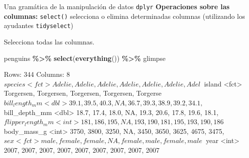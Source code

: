 \documentclass[
  ignorenonframetext,
  aspectratio=169]{beamer}
\newenvironment{Shaded}{\begin{snugshade}}{\end{snugshade}}
\newcommand{\FunctionTok}[1]{\textcolor[rgb]{0.13,0.29,0.53}{\textbf{#1}}}
\newcommand{\NormalTok}[1]{#1}
\newcommand{\SpecialCharTok}[1]{\textcolor[rgb]{0.81,0.36,0.00}{\textbf{#1}}}
\let\oldverbatim\verbatim
\let\endoldverbatim\endverbatim
\renewenvironment{verbatim}{\tiny\oldverbatim}{\endoldverbatim}
\begin{document}

\begin{frame}[fragile]{Una gramática de la manipulación de datos
\texttt{dplyr}}
\label{una-gramuxe1tica-de-la-manipulaciuxf3n-de-datos-dplyr-8}
\textbf{Operaciones sobre las columnas:} \texttt{select()} selecciona o
elimina determinadas columnas (utilizando los ayudantes
\texttt{tidyselect})

Selecciona todas las columnas.

\begin{Shaded}
\begin{Highlighting}[]
\NormalTok{penguins }\SpecialCharTok{\%\textgreater{}\%} 
  \FunctionTok{select}\NormalTok{(}\FunctionTok{everything}\NormalTok{()) }\SpecialCharTok{\%\textgreater{}\%} 
\NormalTok{  glimpse}
\end{Highlighting}
\end{Shaded}

\begin{verbatim}
Rows: 344
Columns: 8
$ species           <fct> Adelie, Adelie, Adelie, Adelie, Adelie, Adelie, Adel~
$ island            <fct> Torgersen, Torgersen, Torgersen, Torgersen, Torgerse~
$ bill_length_mm    <dbl> 39.1, 39.5, 40.3, NA, 36.7, 39.3, 38.9, 39.2, 34.1, ~
$ bill_depth_mm     <dbl> 18.7, 17.4, 18.0, NA, 19.3, 20.6, 17.8, 19.6, 18.1, ~
$ flipper_length_mm <int> 181, 186, 195, NA, 193, 190, 181, 195, 193, 190, 186~
$ body_mass_g       <int> 3750, 3800, 3250, NA, 3450, 3650, 3625, 4675, 3475, ~
$ sex               <fct> male, female, female, NA, female, male, female, male~
$ year              <int> 2007, 2007, 2007, 2007, 2007, 2007, 2007, 2007, 2007~
\end{verbatim}
\end{frame}
\end{document}
